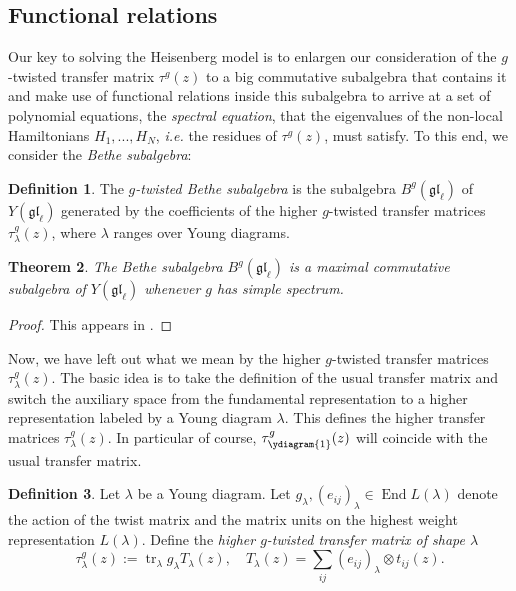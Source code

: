 \documentclass[11pt]{report}
\newtheorem{theorem}{Theorem}[section]
\theoremstyle{definition}
\newtheorem{definition}[theorem]{Definition}
\theoremstyle{remark}
\theoremstyle{remark}
\begin{document}
\subsection{Functional relations}

Our key to solving the Heisenberg model is to enlargen our consideration of the $g$-twisted transfer matrix $\tau^g(z)$ to a big commutative subalgebra that contains it and make use of functional relations inside this subalgebra to arrive at a set of polynomial equations, the \emph{spectral equation}, that the eigenvalues of the non-local Hamiltonians $H_1,...,H_N$, \emph{i.e.} the residues of $\tau^g(z)$, must satisfy. To this end, we consider the \emph{Bethe subalgebra}:

\begin{definition}
The \emph{$g$-twisted Bethe subalgebra} is the subalgebra $B^g(\mathfrak{gl}_\ell)$ of $Y(\mathfrak{gl}_\ell)$ generated by the coefficients of the higher $g$-twisted transfer matrices $\tau_\lambda^g(z)$, where $\lambda$ ranges over Young diagrams.
\end{definition}

\begin{theorem}
The Bethe subalgebra $B^g(\mathfrak{gl}_\ell)$ is a maximal commutative subalgebra of $Y(\mathfrak{gl}_\ell)$ whenever $g$ has simple spectrum.
\end{theorem}

\begin{proof}
This appears in \cite{article:nazarov:1996}.
\end{proof}

Now, we have left out what we mean by the higher $g$-twisted transfer matrices $\tau_\lambda^g(z)$. The basic idea is to take the definition of the usual transfer matrix and switch the auxiliary space from the fundamental representation to a higher representation labeled by a Young diagram $\lambda$. This defines the higher transfer matrices $\tau_\lambda^g(z)$. In particular of course, $\tau_{\ydiagram{1}}^g(z)$ will coincide with the usual transfer matrix.

\begin{definition}
Let $\lambda$ be a Young diagram. Let $g_\lambda,(e_{ij})_\lambda \in \operatorname{End} L(\lambda)$ denote the action of the twist matrix and the matrix units on the highest weight representation $L(\lambda)$. Define the \emph{higher $g$-twisted transfer matrix of shape $\lambda$}
\begin{equation*}
\tau_\lambda^g(z) := \operatorname{tr}_\lambda g_\lambda T_\lambda(z), \quad T_\lambda(z) = \sum_{ij} (e_{ij})_\lambda \otimes t_{ij}(z).
\end{equation*}
\end{definition}
\end{document}
